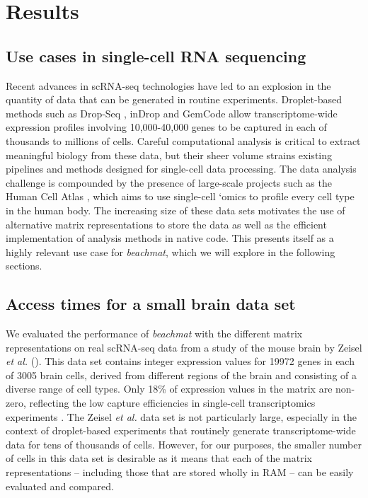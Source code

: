 \documentclass[10pt,letterpaper]{article}
\newcommand{\beachmat}{\textit{beachmat}}
\begin{document}
\section*{Results}

\subsection*{Use cases in single-cell RNA sequencing}
Recent advances in scRNA-seq technologies have led to an explosion in the quantity of data that can be generated in routine experiments.
Droplet-based methods such as Drop-Seq \cite{macosko2015highly}, inDrop \cite{klein2015droplet} and GemCode \cite{zheng2017massively} allow transcriptome-wide expression profiles involving 10,000-40,000 genes to be captured in each of thousands to millions of cells.
Careful computational analysis is critical to extract meaningful biology from these data, but their sheer volume strains existing pipelines and methods designed for single-cell data processing.
The data analysis challenge is compounded by the presence of large-scale projects such as the Human Cell Atlas \cite{regev2017human}, which aims to use single-cell `omics to profile every cell type in the human body.
The increasing size of these data sets motivates the use of alternative matrix representations to store the data as well as the efficient implementation of analysis methods in native code.
This presents itself as a highly relevant use case for \beachmat{}, which we will explore in the following sections.

\subsection*{Access times for a small brain data set}
We evaluated the performance of \beachmat{} with the different matrix representations on real scRNA-seq data from a study of the mouse brain by Zeisel \textit{et al.} \cite{zeisel2015brain} (\suppsecrealzeisel{}). 
This data set contains integer expression values for 19972 genes in each of 3005 brain cells, derived from different regions of the brain and consisting of a diverse range of cell types.
Only 18\% of expression values in the matrix are non-zero, reflecting the low capture efficiencies in single-cell transcriptomics experiments \cite{grun2015design}.
The Zeisel \textit{et al.} data set is not particularly large, especially in the context of droplet-based experiments that routinely generate transcriptome-wide data for tens of thousands of cells.
However, for our purposes, the smaller number of cells in this data set is desirable as it means that each of the matrix representations -- including those that are stored wholly in RAM -- can be easily evaluated and compared.
\end{document}
